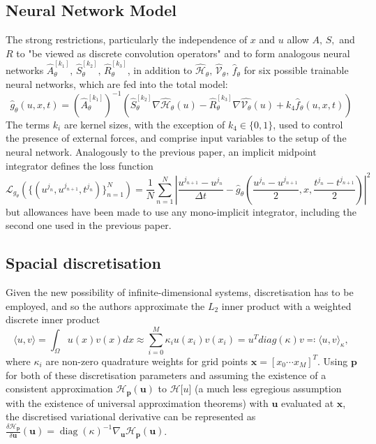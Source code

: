 \documentclass[10 pt, a4paper]{article}
\DeclareMathOperator{\diag}{diag}
\begin{document}
\subsection{Neural Network Model}
The strong restrictions, particularly the independence of $x$ and $u$ allow $A,\,S,$ and $R$ to "be viewed as discrete convolution operators" and to form analogous neural networks $\hat{A}_\theta^{[k_1]},\,\hat{S}_\theta^{[k_2]},\,\hat{R}_\theta^{[k_3]}$, in addition to $\hat{\mathcal{H}}_\theta,\, \hat{\mathcal{V}}_\theta,\,\hat{f}_\theta$ for six possible trainable neural networks, which are fed into the total model:
\begin{equation*}
	\hat{g}_\theta (u,x,t) = (\hat{A}_\theta^{[k_1]})^{-1} \left(\hat{S}_\theta^{[k_2]} \nabla \hat{\mathcal{H}}_\theta(u) - \hat{R}_\theta^{[k_3]} \nabla\hat{\mathcal{V}_\theta}(u) + k_4 \hat{f}_\theta(u,x,t) \right)
\end{equation*}
The terms $k_i$ are kernel sizes, with the exception of $k_4\in\{0,1\}$, used to control the presence of external forces, and comprise input variables to the setup of the neural network. Analogously to the previous paper, an implicit midpoint integrator defines the loss function
\begin{equation*}
	\mathcal{L}_{g_\theta}(\{(u^{j_n},u^{j_{n+1}},t^{j_n})\}_{n=1}^{N}) = \frac{1}{N} \sum\limits_{n=1}^N \left\vert \frac{u^{j_{n+1}}-u^{j_n}}{\Delta t} - \hat{g}_\theta \left( \frac{u^{j_n}-u^{j_{n+1}}}{2}, x, \frac{t^{j_n}-t^{j_{n+1}}}{2} \right) \right\vert^2
\end{equation*}
but allowances have been made to use any mono-implicit integrator, including the second one used in the previous paper.
\subsection{Spacial discretisation}
Given the new possibility of infinite-dimensional systems, discretisation has to be employed, and so the authors approximate the $L_2$ inner product with a weighted discrete inner product 
\[\langle u,v \rangle = \int_\Omega u(x)v(x)dx \approx \sum\limits_{i=0}^M \kappa_i u(x_i)v(x_i) = u^T diag(\kappa)v \eqqcolon \langle u,v \rangle _\kappa,\]
where $\kappa_i$ are non-zero quadrature weights for grid points $\mathbf{x}=[x_0 \cdots x_M]^T$. Using $\mathbf{p}$ for both of these discretisation parameters and assuming the existence of a consistent approximation $\mathcal{H}_\mathbf{p}(\mathbf{u})$ to $\mathcal{H}[u$] (a much less egregious assumption with the existence of universal approximation theorems) with $\mathbf{u}$ evaluated at $\mathbf{x}$, the discretised variational derivative can be represented as \(\frac{\delta\mathcal{H}_\mathbf{p}}{\delta \mathbf{u}}(\mathbf{u}) = \diag(\kappa)^{-1}\nabla_\mathbf{u}\mathcal{H}_\mathbf{p}(\mathbf{u})\).
\end{document}
